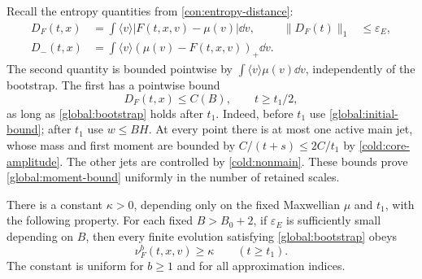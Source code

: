 Recall the entropy quantities from \eqref{con:entropy-distance}:
\begin{equation}\label{global:entropy-distance}
 \begin{aligned}
 D_F(t,x)&=\int\langle v\rangle|F(t,x,v)-\mu(v)|\dd v,
 &\|D_F(t)\|_1&\le\varepsilon_E,\\
 D_-(t,x)&=\int\langle v\rangle(\mu(v)-F(t,x,v))_+\dd v.
 \end{aligned}
\end{equation}
The second quantity is bounded pointwise by
$\int\langle v\rangle\mu(v)\dd v$, independently of the bootstrap.
The first has a pointwise bound
\begin{equation}\label{global:moment-bound}
 D_F(t,x)\le C(B),\qquad t\ge t_1/2,
\end{equation}
as long as \eqref{global:bootstrap} holds after $t_1$.  Indeed, before
$t_1$ use \eqref{global:initial-bound}; after $t_1$ use $w\le BH$.
At every point there is at most one active main jet, whose mass and
first moment are bounded by $C/(t+s)\le2C/t_1$ by
\cref{cold:core-amplitude}.  The other jets are controlled by
\cref{cold:nonmain}.  These bounds prove \eqref{global:moment-bound}
uniformly in the number of retained scales.

\begin{lemma}
\label{global:frequency}
There is a constant $\kappa>0$, depending only on the fixed Maxwellian
$\mu$ and $t_1$, with the following property.  For each fixed $B>B_0+2$,
if $\varepsilon_E$ is sufficiently small depending on $B$, then every
finite evolution satisfying \eqref{global:bootstrap} obeys
\begin{equation}\label{global:frequency-bound}
 \nu_F^b(t,x,v)\ge\kappa\qquad(t\ge t_1).
\end{equation}
The constant is uniform for $b\ge1$ and for all approximation indices.
\end{lemma}

